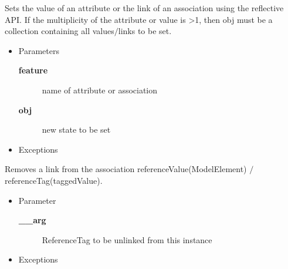\begin{desc}Sets the value of an attribute or the link of an association using the
 reflective API. If the multiplicity of the attribute or value is \textgreater  1,
 then obj must be a collection containing all values$/$links to be set.
\begin{itemize}
\item{Parameters
  \begin{description}
   \item[{\bf feature}]{name of attribute or association}
   \item[{\bf obj}]{new state to be set}
  \end{description}}
\end{itemize}
\begin{itemize}
\item{{Exceptions}
}
\end{itemize}
\end{desc}

\begin{desc}Removes a link from the association referenceValue(ModelElement)
  $/$ referenceTag(taggedValue).
\begin{itemize}
\item{Parameter
  \begin{description}
   \item[{\bf \_\_arg}]{ReferenceTag to be unlinked from this instance}
  \end{description}}
\end{itemize}
\begin{itemize}
\item{{Exceptions}
}
\end{itemize}
\end{desc}


